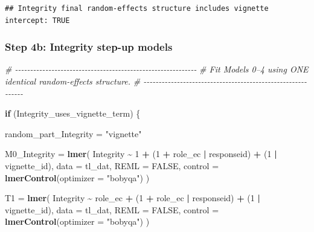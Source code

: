 \documentclass[
]{article}
\newenvironment{Shaded}{\begin{snugshade}}{\end{snugshade}}
\newcommand{\AttributeTok}[1]{\textcolor[rgb]{0.13,0.29,0.53}{#1}}
\newcommand{\CommentTok}[1]{\textcolor[rgb]{0.56,0.35,0.01}{\textit{#1}}}
\newcommand{\ConstantTok}[1]{\textcolor[rgb]{0.56,0.35,0.01}{#1}}
\newcommand{\ControlFlowTok}[1]{\textcolor[rgb]{0.13,0.29,0.53}{\textbf{#1}}}
\newcommand{\DecValTok}[1]{\textcolor[rgb]{0.00,0.00,0.81}{#1}}
\newcommand{\FunctionTok}[1]{\textcolor[rgb]{0.13,0.29,0.53}{\textbf{#1}}}
\newcommand{\NormalTok}[1]{#1}
\newcommand{\OtherTok}[1]{\textcolor[rgb]{0.56,0.35,0.01}{#1}}
\newcommand{\SpecialCharTok}[1]{\textcolor[rgb]{0.81,0.36,0.00}{\textbf{#1}}}
\newcommand{\StringTok}[1]{\textcolor[rgb]{0.31,0.60,0.02}{#1}}
\begin{document}
\begin{verbatim}
## Integrity final random-effects structure includes vignette intercept: TRUE
\end{verbatim}

\subsubsection{Step 4b: Integrity step-up
models}\label{step-4b-integrity-step-up-models}

\begin{Shaded}
\begin{Highlighting}[]
\CommentTok{\# {-}{-}{-}{-}{-}{-}{-}{-}{-}{-}{-}{-}{-}{-}{-}{-}{-}{-}{-}{-}{-}{-}{-}{-}{-}{-}{-}{-}{-}{-}{-}{-}{-}{-}{-}{-}{-}{-}{-}{-}{-}{-}{-}{-}{-}{-}{-}{-}{-}{-}{-}{-}{-}{-}{-}{-}{-}{-}{-}{-}}
\CommentTok{\# Fit Models 0–4 using ONE identical random{-}effects structure.}
\CommentTok{\# {-}{-}{-}{-}{-}{-}{-}{-}{-}{-}{-}{-}{-}{-}{-}{-}{-}{-}{-}{-}{-}{-}{-}{-}{-}{-}{-}{-}{-}{-}{-}{-}{-}{-}{-}{-}{-}{-}{-}{-}{-}{-}{-}{-}{-}{-}{-}{-}{-}{-}{-}{-}{-}{-}{-}{-}{-}{-}{-}{-}}

\ControlFlowTok{if}\NormalTok{ (Integrity\_uses\_vignette\_term) \{}

\NormalTok{  random\_part\_Integrity }\OtherTok{=} \StringTok{"vignette"}

\NormalTok{  M0\_Integrity }\OtherTok{=} \FunctionTok{lmer}\NormalTok{(}
\NormalTok{    Integrity }\SpecialCharTok{\textasciitilde{}} \DecValTok{1} \SpecialCharTok{+}
\NormalTok{      (}\DecValTok{1} \SpecialCharTok{+}\NormalTok{ role\_ec }\SpecialCharTok{|}\NormalTok{ responseid) }\SpecialCharTok{+}
\NormalTok{      (}\DecValTok{1} \SpecialCharTok{|}\NormalTok{ vignette\_id),}
    \AttributeTok{data =}\NormalTok{ tl\_dat,}
    \AttributeTok{REML =} \ConstantTok{FALSE}\NormalTok{,}
    \AttributeTok{control =} \FunctionTok{lmerControl}\NormalTok{(}\AttributeTok{optimizer =} \StringTok{"bobyqa"}\NormalTok{)}
\NormalTok{  )}

\NormalTok{  T1 }\OtherTok{=} \FunctionTok{lmer}\NormalTok{(}
\NormalTok{    Integrity }\SpecialCharTok{\textasciitilde{}}\NormalTok{ role\_ec }\SpecialCharTok{+}
\NormalTok{      (}\DecValTok{1} \SpecialCharTok{+}\NormalTok{ role\_ec }\SpecialCharTok{|}\NormalTok{ responseid) }\SpecialCharTok{+}
\NormalTok{      (}\DecValTok{1} \SpecialCharTok{|}\NormalTok{ vignette\_id),}
    \AttributeTok{data =}\NormalTok{ tl\_dat,}
    \AttributeTok{REML =} \ConstantTok{FALSE}\NormalTok{,}
    \AttributeTok{control =} \FunctionTok{lmerControl}\NormalTok{(}\AttributeTok{optimizer =} \StringTok{"bobyqa"}\NormalTok{)}
\NormalTok{  )}


\end{Highlighting}
\end{Shaded}
\end{document}
